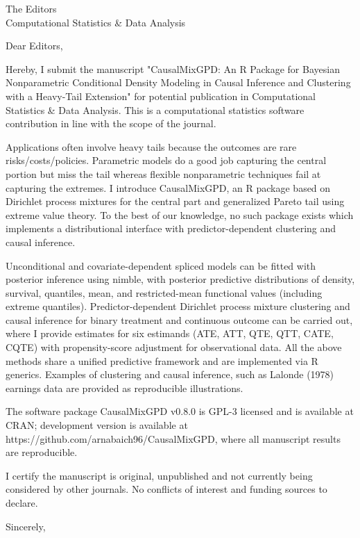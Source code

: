 \documentclass[11pt]{letter}
\date{}
\begin{document}
\begin{letter}{The Editors \\ Computational Statistics \& Data Analysis}

\opening{Dear Editors,}

Hereby, I submit the manuscript "CausalMixGPD: An R Package for Bayesian Nonparametric Conditional Density Modeling in Causal Inference and Clustering with a Heavy-Tail Extension" for potential publication in Computational Statistics \& Data Analysis. This is a computational statistics software contribution in line with the scope of the journal.

Applications often involve heavy tails because the outcomes are rare risks/costs/policies. Parametric models do a good job capturing the central portion but miss the tail whereas flexible nonparametric techniques fail at capturing the extremes. I introduce CausalMixGPD, an R package based on Dirichlet process mixtures for the central part and generalized Pareto tail using extreme value theory. To the best of our knowledge, no such package exists which implements a distributional interface with predictor-dependent clustering and causal inference.

Unconditional and covariate-dependent spliced models can be fitted with posterior inference using nimble, with posterior predictive distributions of density, survival, quantiles, mean, and restricted-mean functional values (including extreme quantiles). Predictor-dependent Dirichlet process mixture clustering and causal inference for binary treatment and continuous outcome can be carried out, where I provide estimates for six estimands (ATE, ATT, QTE, QTT, CATE, CQTE) with propensity-score adjustment for observational data. All the above methods share a unified predictive framework and are implemented via R generics. Examples of clustering and causal inference, such as Lalonde (1978) earnings data are provided as reproducible illustrations.

The software package CausalMixGPD v0.8.0 is GPL-3 licensed and is available at CRAN; development version is available at https://github.com/arnabaich96/CausalMixGPD, where all manuscript results are reproducible.

I certify the manuscript is original, unpublished and not currently being considered by other journals. No conflicts of interest and funding sources to declare.

\closing{Sincerely,}

\end{letter}
\end{document}

